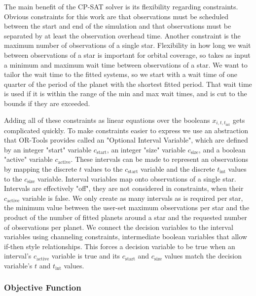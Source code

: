 The main benefit of the CP-SAT solver is its flexibility regarding constraints.
Obvious constraints for this work are that observations must be scheduled
between the start and end of the simulation and that observations must be
separated by at least the observation overhead time. Another constraint is the
maximum number of observations of a single star. Flexibility in how long we
wait between observations of a star is important for orbital coverage, so
 takes as input a minimum and maximum wait time between observations
of a star. We want to tailor the wait time to the fitted systems, so we start
with a wait time of one quarter of the period of the planet with the shortest
fitted period. That wait time is used if it is within the range of the min and
max wait times, and is cut to the bounds if they are exceeded.

Adding all of these constraints as linear equations over the booleans $x_{i, t,
t_{\textrm{int}}}$ gets complicated quickly. To make constraints easier to
express we use an abstraction that OR-Tools provides called an "Optional
Interval Variable", which are defined by an integer "start" variable
$c_\textrm{start}$, an integer "size" variable $c_\textrm{size}$, and a boolean
"active" variable $c_\textrm{active}$. These intervals can be made to represent
an observations by mapping the discrete $t$ values to the $c_\textrm{start}$
variable and the discrete $t_\textrm{int}$ values to the $c_\textrm{size}$
variable. Interval variables map onto observations of a single star. Intervals
are effectively "off", they are not considered in constraints, when their
$c_\textrm{active}$ variable is false. We only create as many intervals as is
required per star, the minimum value between the user-set maximum observations
per star and the product of the number of fitted planets around a star and the
requested number of observations per planet. We connect the decision variables
to the interval variables using channeling constraints, intermediate boolean
variables that allow if-then style relationships. This forces a decision
variable to be true when an interval's $c_\textrm{active}$ variable is true and
its $c_\textrm{start}$ and $c_\textrm{size}$ values match the decision
variable's $t$ and $t_\textrm{int}$ values.

\subsubsection{Objective Function}

